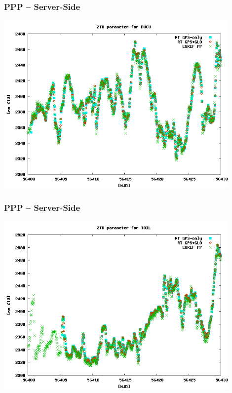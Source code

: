 \documentclass[10pt]{beamer}
\begin{document}
\begin{frame}
\frametitle{PPP -- Server-Side}
  \begin{center}
    \includegraphics[width=0.9\textwidth,angle=0]{tropo1.png}
  \end{center}
\end{frame}


\begin{frame}
\frametitle{PPP -- Server-Side}
  \begin{center}
    \includegraphics[width=0.9\textwidth,angle=0]{tropo2.png}
  \end{center}
\end{frame}

\end{document}
